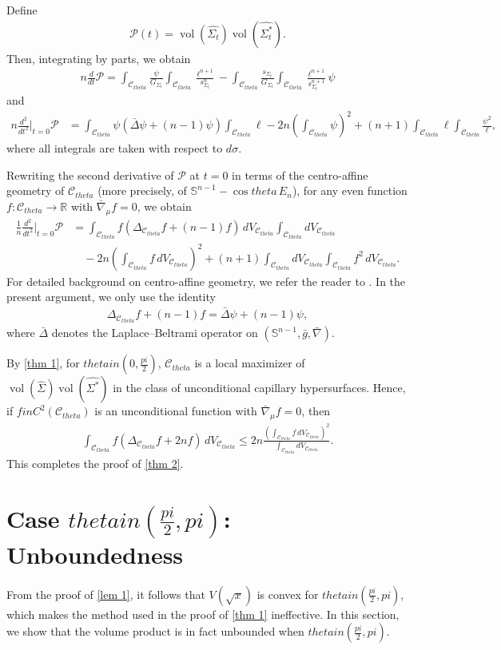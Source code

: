 \documentclass[12pt]{amsart}
\def\theta{theta}%
\def\pi{pi}%
\def\in{in }%
\numberwithin{equation}{section}
\newcommand{\wh}{\widehat}
\newcommand{\cn}{\colon}
\newcommand{\bbR}{\mathbb{R}}
\newcommand{\bbS}{\mathbb{S}}
\newcommand{\8}{\infty}
\newcommand{\si}{\sigma}
\newcommand{\Si}{\Sigma}
\newcommand{\De}{\Delta}
\newcommand{\cC}{\mathcal{C}}
\newcommand{\cP}{\mathcal{P}}
\DeclareMathOperator{\vol}{vol}
\renewcommand{\(}{\left(}
\renewcommand{\)}{\right)}
\newcommand{\eq}[1]{\begin{equation}\begin{alignedat}{2} #1 \end{alignedat}\end{equation}}
\newcommand{\q}{\quad}
\begin{document}
Define
\eq{
\cP(t) = \vol(\wh{\Si_t}) \vol(\wh{\Si_t^{\ast}}).
}
Then, integrating by parts, we obtain
\begin{align}\label{a}
    n \frac{d}{dt} \cP = \int_{\cC_{\theta}} \frac{\psi}{G_{\Si_t}}\int_{\cC_{\theta}} \frac{\ell^{n+1}}{s_{\Si_t}^{n}} - \int_{\cC_{\theta}} \frac{s_{\Si_t}}{G_{\Si_t}} \int_{\cC_{\theta}} \frac{\ell^{n+1}}{s_{\Si_t}^{n+1}} \psi
\end{align}
and
\eq{
n \frac{d^2}{dt^2} \Big|_{t=0} \cP &= \int_{\cC_{\theta}} \psi (\bar{\De} \psi + (n-1) \psi) \int_{\cC_{\theta}} \ell - 2n \left( \int_{\cC_{\theta}} \psi \right)^2 + (n+1) \int_{\cC_{\theta}} \ell \int_{\cC_{\theta}} \frac{\psi^2}{\ell},
}
where all integrals are taken with respect to $d\si$. 

Rewriting the second derivative of $\cP$ at $t=0$ in terms of the centro-affine geometry of $\cC_{\theta}$ (more precisely, of $\bbS^{n-1} - \cos\theta\, E_{n}$), for any even function $f \cn \cC_{\theta} \to \bbR$ with $\bar{\nabla}_{\mu} f = 0$, we obtain
\eq{
\frac{1}{n} \frac{d^2}{dt^2} \Big|_{t=0} \cP &= \int_{\cC_{\theta}} f (\De_{\cC_{\theta}} f + (n-1) f) \, dV_{\cC_{\theta}} \int_{\cC_{\theta}} dV_{\cC_{\theta}} \\
&\q - 2n \left( \int_{\cC_{\theta}} f \, dV_{\cC_{\theta}} \right)^2 + (n+1) \int_{\cC_{\theta}} dV_{\cC_{\theta}} \int_{\cC_{\theta}} f^2 \, dV_{\cC_{\theta}}.
}
For detailed background on centro-affine geometry, we refer the reader to \cite{Mil23}. In the present argument, we only use the identity
\eq{
\Delta_{\mathcal{C}_{\theta}} f + (n-1) f
=\bar{\Delta} \psi + (n-1)\psi,
}
where $\bar{\Delta}$ denotes the Laplace--Beltrami operator on $(\bbS^{n-1},\bar g,\bar \nabla)$.

By \autoref{thm 1}, for $\theta\in (0,\tfrac{\pi}{2})$,  $\cC_{\theta}$ is a local maximizer of $\vol(\wh{\Si}) \vol(\wh{\Si^{\ast}})$ in the class of unconditional capillary hypersurfaces. Hence, if $f\in C^2(\cC_{\theta})$ is an unconditional function with $\bar{\nabla}_{\mu}f=0$, then 
\eq{\label{linearized-ineq}
\int_{\cC_{\theta}} f (\De_{\cC_{\theta}} f + 2n f) \, dV_{\cC_{\theta}} \leq 2n \frac{\left( \int_{\cC_{\theta}} f \, dV_{\cC_{\theta}} \right)^2}{\int_{\cC_{\theta}} dV_{\cC_{\theta}}}.
}
This completes the proof of \autoref{thm 2}.


\section{\texorpdfstring{Case $\theta\in (\frac{\pi}{2}, \pi)$: Unboundedness}{Case theta in (pi/2, pi)}}
From the proof of \autoref{lem 1}, it follows that $V(\sqrt{x})$ is convex for $\theta \in (\frac{\pi}{2}, \pi)$, which makes the method used in the proof of \autoref{thm 1} ineffective. In this section, we show that the volume product is in fact unbounded when $\theta \in (\frac{\pi}{2}, \pi)$.
\end{document}
